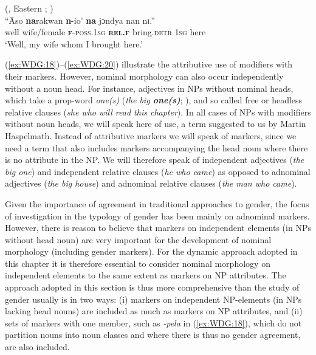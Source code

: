 \documentclass[output=collectionpaper]{langsci/langscibook}
\begin{document}
\ea\label{ex:WDG:20}
 (, Eastern ; \citealt[396]{Spagnolo1933})\\
\gll	``Āso	\textbf{na}rakwan	\textbf{n}-io'	\textbf{na}	jɔndya	nan	nɪ.''\\
well	wife/female	\textbf{\textsc{f}}-\textsc{poss.1sg}	\textbf{\textsc{rel.f}}	bring.\textsc{detr}	\textsc{1sg}	here\\
\glt `Well, my wife whom I brought here.'\\
\z

(\ref{ex:WDG:18})--(\ref{ex:WDG:20}) illustrate the attributive use of modifiers with their markers. However, nominal morphology can also occur independently without a noun head. For instance,  adjectives in NPs without nominal heads, which take a prop-word \textit{one(s)} (\textit{the big \textbf{one(s)}}; \citealt[245--271]{Jespersen1949}), and so called free or headless relative clauses (\textit{she who will read this chapter}). In all cases of NPs with modifiers without noun heads, we will speak here of  use, a term suggested to us by Martin Haspelmath. Instead of attributive markers we will speak of  markers, since we need a term that also includes markers accompanying the head noun where there is no attribute in the NP. We will therefore speak of independent adjectives (\textit{the big one}) and independent relative clauses (\textit{he who came}) as opposed to adnominal adjectives (\textit{the big house}) and adnominal relative clauses (\textit{the man who came}).

Given the importance of agreement in traditional approaches to gender, the focus of investigation in the typology of gender has been mainly on adnominal markers. However, there is reason to believe that markers on independent elements (in NPs without head noun) are very important for the development of nominal morphology (including gender markers). For the dynamic approach adopted in this chapter it is therefore essential to consider nominal morphology on independent elements to the same extent  as markers on NP attributes. The approach adopted in this section is thus more comprehensive than the study of gender usually is in two ways: (i) markers on independent NP-elements (in NPs lacking head nouns) are included as much as markers on NP attributes, and (ii) sets of markers with one member, such as  \textit{-pela} in (\ref{ex:WDG:18}), which do not partition nouns into noun classes and where there is thus no gender agreement, are also included.
\end{document}
